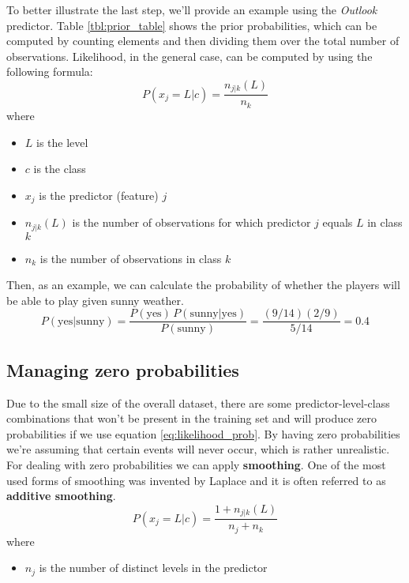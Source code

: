 To better illustrate the last step, we'll provide an example using the \textit{Outlook} predictor. Table \ref{tbl:prior_table} shows the prior probabilities, which can be computed by counting elements and then dividing them over the total number of observations. Likelihood, in the general case, can be computed by using the following formula:
\begin{equation} \label{eq:likelihood_prob}
P(x_j = L|c) = \frac{n_{j|k}(L) }{n_k}
\end{equation}
where
\begin{itemize}
	\item $L$ is the level
	\item $c$ is the class
	\item $x_j$ is the predictor (feature) $j$
	\item $n_{j|k}(L)$ is the number of observations for which predictor $j$ equals $L$ in class $k$
	\item $n_k$ is the number of observations in class $k$
\end{itemize}

Then, as an example, we can calculate the probability of whether the players will be able to play given sunny weather.
\begin{equation*}
P(\text{yes}|\text{sunny}) = \frac{P(\text{yes}) \, P(\text{sunny}|\text{yes})}{P(\text{sunny})} = \frac{(9/14)(2/9)}{5/14} = 0.4
\end{equation*}

\subsection{Managing zero probabilities}
Due to the small size of the overall dataset, there are some predictor-level-class combinations that won't be present in the training set and will produce zero probabilities if we use equation \ref{eq:likelihood_prob}. By having zero probabilities we're assuming that certain events will never occur, which is rather unrealistic. For dealing with zero probabilities we can apply \textbf{smoothing}. One of the most used forms of smoothing was invented by Laplace and it is often referred to as \textbf{additive smoothing}.
\begin{equation}
P(x_j = L|c) = \frac{1 + n_{j|k}(L) }{n_j + n_k}
\end{equation} 
where
\begin{itemize}
	\item $n_j$ is the number of distinct levels in the predictor
\end{itemize} 

